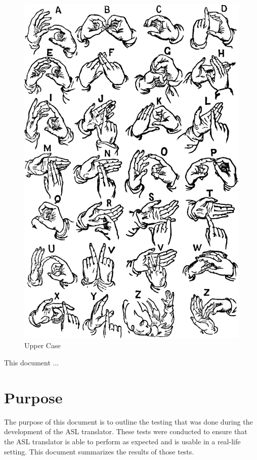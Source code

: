 \documentclass[12pt, titlepage]{article}
\begin{document}
\begin{figure}[H] 
\centering
\includegraphics[width=\textwidth,height=0.8\textheight,keepaspectratio]{upper_cases.PNG} 
\caption{Upper Case} 
\label{Fig.Upper Case} 
\end{figure}

\newpage

\tableofcontents

\listoftables %

\listoffigures %

\newpage


This document ...

\section{Purpose}
The purpose of this document is to outline the testing that was done during the development 
of the ASL translator. These tests were conducted to ensure that the ASL translator is able 
to perform as expected and is usable in a real-life setting. This document summarizes the 
results of those tests.
\end{document}
